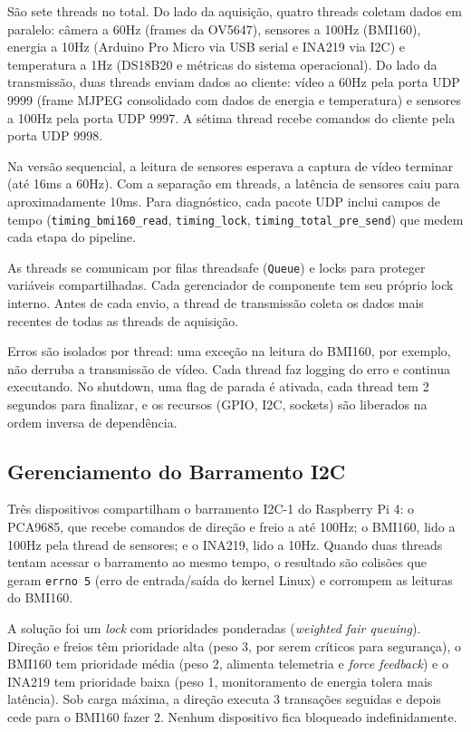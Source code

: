 São sete threads no total. Do lado da aquisição, quatro threads coletam dados em paralelo: câmera a 60Hz (frames da OV5647), sensores a 100Hz (BMI160), energia a 10Hz (Arduino Pro Micro via \gls{USB} serial e INA219 via \gls{I2C}) e temperatura a 1Hz (DS18B20 e métricas do sistema operacional). Do lado da transmissão, duas threads enviam dados ao cliente: vídeo a 60Hz pela porta \gls{UDP} 9999 (frame \gls{MJPEG} consolidado com dados de energia e temperatura) e sensores a 100Hz pela porta \gls{UDP} 9997. A sétima thread recebe comandos do cliente pela porta \gls{UDP} 9998.

Na versão sequencial, a leitura de sensores esperava a captura de vídeo terminar (até 16ms a 60Hz). Com a separação em threads, a latência de sensores caiu para aproximadamente 10ms. Para diagnóstico, cada pacote \gls{UDP} inclui campos de tempo (\texttt{timing\_bmi160\_read}, \texttt{timing\_lock}, \texttt{timing\_total\_pre\_send}) que medem cada etapa do pipeline.

As threads se comunicam por filas \gls{threadsafe} (\texttt{Queue}) e locks para proteger variáveis compartilhadas. Cada gerenciador de componente tem seu próprio lock interno. Antes de cada envio, a thread de transmissão coleta os dados mais recentes de todas as threads de aquisição.

Erros são isolados por thread: uma exceção na leitura do BMI160, por exemplo, não derruba a transmissão de vídeo. Cada thread faz logging do erro e continua executando. No shutdown, uma flag de parada é ativada, cada thread tem 2 segundos para finalizar, e os recursos (\gls{GPIO}, \gls{I2C}, sockets) são liberados na ordem inversa de dependência.

\subsection{Gerenciamento do Barramento \gls{I2C}}
\label{subsec:gerenciamento-i2c}

Três dispositivos compartilham o barramento \gls{I2C}-1 do Raspberry Pi 4: o PCA9685, que recebe comandos de direção e freio a até 100Hz; o BMI160, lido a 100Hz pela thread de sensores; e o INA219, lido a 10Hz. Quando duas threads tentam acessar o barramento ao mesmo tempo, o resultado são colisões que geram \texttt{errno 5} (erro de entrada/saída do kernel Linux) e corrompem as leituras do BMI160.

A solução foi um \textit{lock} com prioridades ponderadas (\textit{weighted fair queuing}). Direção e freios têm prioridade alta (peso 3, por serem críticos para segurança), o BMI160 tem prioridade média (peso 2, alimenta telemetria e \textit{force feedback}) e o INA219 tem prioridade baixa (peso 1, monitoramento de energia tolera mais latência). Sob carga máxima, a direção executa 3 transações seguidas e depois cede para o BMI160 fazer 2. Nenhum dispositivo fica bloqueado indefinidamente.

